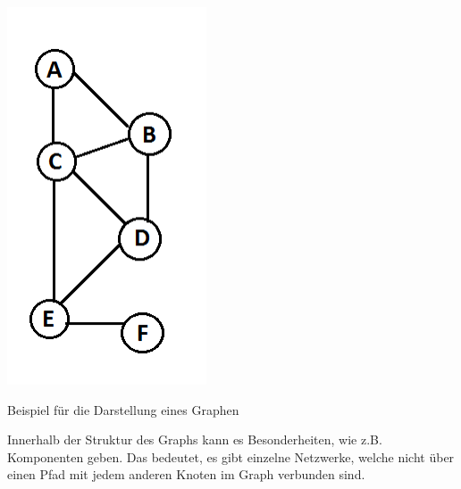 \begin{dsafigure}
	\begin{center}
	\includegraphics[width=0.9\columnwidth]{img/graph1.png}
	\caption{Beispiel für die Darstellung eines Graphen \parencite[vgl.]{Kleinberg-2009-oz}}
	\label{fig:graph1}
	\end{center}
\end{dsafigure}

Innerhalb der Struktur des Graphs kann es Besonderheiten, wie z.B. Komponenten geben.
Das bedeutet, es gibt einzelne Netzwerke, welche nicht über einen Pfad mit jedem anderen Knoten im Graph verbunden sind.

